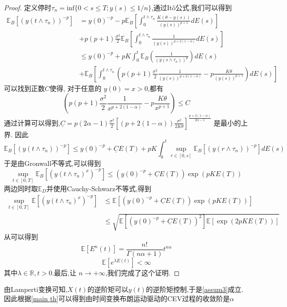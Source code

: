 \begin{proof}
	定义停时$\tau_{n}=\mathrm{inf}\{0<s\leq T;y(s)\leq1/n\}$,通过It\^{o}公式,我们可以得到
	$$\begin{aligned}
		\mathbb{E}_B\left[(y(t\wedge\tau_{n}))^{-p}\right] &=y(0)^{-p}-p\mathbb{E}_B\left[\int_{0}^{t\wedge\tau_{n}}\frac{K(\theta-y(s))}{(y(s))^{p+1}}dE(s)\right]\\
		&+p(p+1)\frac{\sigma^{2}}{2}\mathbb{E}_B\left[\int_{0}^{t\wedge\tau_{n}}\frac{1}{(y(s))^{p+2(1-\alpha)}}dE(s)\right] \\
		&\leq y(0)^{-p}+pK\int_{0}^{t}\mathbb{E}_B\left(\frac{1}{(y(s\wedge\tau_{n}))^{p}}
		\right)dE(s) \\
		&+\mathbb{E}_B\left[\int_0^{t\wedge\tau_n}\left(p(p+1)\frac{\sigma^2}{2}\frac{1}{(y(s))^{p+2(1-\alpha)}}-p\frac{K\theta}{(y(s))^{p+1}}\right)dE(s)\right]
	\end{aligned}$$
	可以找到正数$C$使得, 对于任意的 $y(0)=x>0$,都有
	$$\left(p(p+1)\frac{\sigma^2}{2}\frac{1}{x^{p+2(1-\alpha)}}-p\frac{K\theta}{x^{p+1}}\right)\leq C$$
	通过计算可以得到,$\underline C=p(2\alpha-1)\frac{\sigma^2}{2}\left[(p+2(1-\alpha))\frac{\sigma^2}{2K\theta}\right]^{\frac{p+2(1-\alpha)}{2\alpha-1}}$ 是最小的上界. 因此
	$$\mathbb{E}_B\left[(y(t\wedge\tau_n))^{-p}\right]\leq y(0)^{-p}+\underline{C}E(T)+pK\int_0^t\sup_{r\in[0,s]}\mathbb{E}_B\left[(y(r\wedge\tau_n))^{-p}\right]dE(s)$$
	于是由Gronwall不等式,可以得到
	$$\sup\limits_{t\in[0,T]}\mathbb{E}_B\left[(y(t\wedge\tau_n)^x)^{-p}\right]\leq\left(y(0)^{-p}+\underline{C}E(T)\right)\exp(pKE(T))$$
	两边同时取$\mathbb{E}_D$并使用Cauchy-Schwarz不等式,得到
	$$\begin{aligned}
		\sup\limits_{t\in[0,T]}\mathbb{E}\left[(y(t\wedge\tau_n)^x)^{-p}\right]&\leq\mathbb{E}\left[\left(y(0)^{-p}+\underline{C}E(T)\right)\exp(pKE(T))\right]\\
		&\leq\sqrt{\mathbb{E}\left[\left(y(0)^{-p}+\underline{C}E(T)\right)^2\right]\mathbb{E}\left[\exp(2pKE(T))\right]}
	\end{aligned}$$
	从\cite{jum2014strong}可以得到
	\begin{equation}
		\mathbb{E}[E^n(t)]=\frac{n!}{\Gamma(n\alpha+1)}t^{n\alpha}
	\end{equation}
	\begin{equation}
		\mathbb{E}[e^{\lambda E(t)}]<\infty
	\end{equation}
	其中$\lambda \in \mathbb{R},t>0$.最后,让 $n\to+\infty$,我们完成了这个证明.
\end{proof}


由Lamperti变换可知,$X(t)$的逆阶矩可以$y(t)$的逆阶矩控制,于是\cref{assum3}成立.因此根据\cref{main th}可以得到由时间变换布朗运动驱动的CEV过程的收敛阶是$\alpha$
\

